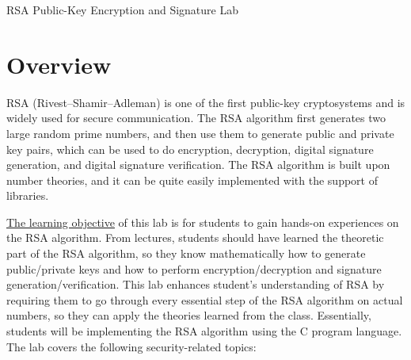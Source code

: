 







\begin{center}
{\LARGE RSA Public-Key Encryption and Signature Lab}
\end{center}




\section{Overview}

RSA (Rivest–Shamir–Adleman) is one of the first public-key cryptosystems
and is widely used for secure communication.
The RSA algorithm first generates two large random prime numbers,
and then use them to generate public and private key pairs, which can be
used to do encryption, decryption, digital signature generation,
and digital signature verification. The RSA algorithm is built upon
number theories, and it can be quite easily implemented with the support of
libraries.


\underline{The learning objective} of this lab is for students to gain hands-on experiences on
the RSA algorithm. From lectures, students should have learned the
theoretic part of the RSA algorithm, so they know
mathematically how to generate public/private keys and
how to perform encryption/decryption and signature generation/verification.
This lab enhances student's understanding of RSA
by requiring them to go through every essential step of the RSA algorithm
on actual numbers, so they can apply the theories learned from the class.
Essentially, students will be implementing the RSA algorithm using
the C program language. The lab covers the following security-related topics:

